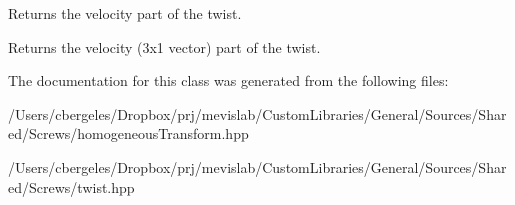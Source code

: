 Returns the velocity part of the twist. 

\begin{DoxyReturn}{Returns}
the velocity (3x1 vector) part of the twist. 
\end{DoxyReturn}


The documentation for this class was generated from the following files\+:\begin{DoxyCompactItemize}
\item 
/\+Users/cbergeles/\+Dropbox/prj/mevislab/\+Custom\+Libraries/\+General/\+Sources/\+Shared/\+Screws/homogeneous\+Transform.\+hpp\item 
/\+Users/cbergeles/\+Dropbox/prj/mevislab/\+Custom\+Libraries/\+General/\+Sources/\+Shared/\+Screws/twist.\+hpp\end{DoxyCompactItemize}
